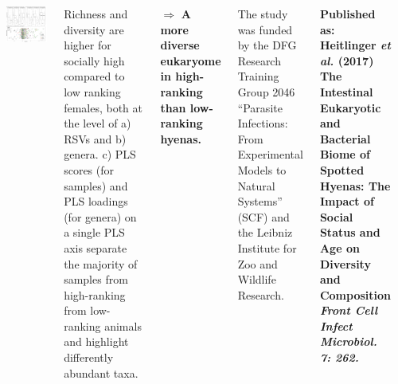 \documentclass[30pt, a0paper, portrait, margin=0mm, innermargin=15mm,
               blockverticalspace=15mm, colspace=15mm, subcolspace=8mm]{tikzposter}
\begin{document}
\begin{columns}
 {
  \begin{minipage}{0.7\linewidth}                  
    \includegraphics[scale=0.67]{Figure4_man.png}
  \end{minipage}
  \hfill
  \begin{minipage}{0.3\linewidth}
    Richness and diversity are higher for socially high compared to
    low ranking females, both at the level of a) RSVs and b) genera.
    c) PLS scores (for samples) and PLS loadings (for genera) on a
    single PLS axis separate the majority of samples from high-ranking
    from low-ranking animals and highlight differently abundant taxa.
  \end{minipage}
  $\Rightarrow$ \textbf{A more diverse eukaryome in high-ranking than
    low-ranking hyenas.} }


{

  The study was funded by the DFG Research Training Group 2046
  ``Parasite Infections: From Experimental Models to Natural Systems''
  (SCF) and the Leibniz Institute for Zoo and Wildlife Research.

  \textbf{Published as:
  \hangindent=2cm  Heitlinger \textit{et al.} (2017) The
    Intestinal Eukaryotic and Bacterial Biome of Spotted Hyenas:
    The Impact of Social Status and Age on Diversity and
    Composition \textit{Front Cell Infect Microbiol. 7: 262.}}
}

      {
        \begin{small}


\end{small}}
\end{columns}
\end{document}
